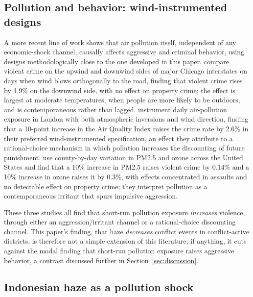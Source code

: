 \documentclass[12pt]{article}
\begin{document}
\subsection{Pollution and behavior: wind-instrumented designs}

A more recent line of work shows that air pollution itself, independent of any economic-shock channel, causally affects aggressive and criminal behavior, using designs methodologically close to the one developed in this paper. \citet{herrnstadt2021} compare violent crime on the upwind and downwind sides of major Chicago interstates on days when wind blows orthogonally to the road, finding that violent crime rises by 1.9\% on the downwind side, with no effect on property crime; the effect is largest at moderate temperatures, when people are more likely to be outdoors, and is contemporaneous rather than lagged. \citet{bondyrothsager2020} instrument daily air-pollution exposure in London with both atmospheric inversions and wind direction, finding that a 10-point increase in the Air Quality Index raises the crime rate by 2.6\% in their preferred wind-instrumented specification, an effect they attribute to a rational-choice mechanism in which pollution increases the discounting of future punishment. \citet{burkhardt2019} use county-by-day variation in PM2.5 and ozone across the United States and find that a 10\% increase in PM2.5 raises violent crime by 0.14\% and a 10\% increase in ozone raises it by 0.3\%, with effects concentrated in assaults and no detectable effect on property crime; they interpret pollution as a contemporaneous irritant that spurs impulsive aggression.

These three studies all find that short-run pollution exposure \emph{increases} violence, through either an aggression/irritant channel or a rational-choice discounting channel. This paper's finding, that haze \emph{decreases} conflict events in conflict-active districts, is therefore not a simple extension of this literature; if anything, it cuts against the modal finding that short-run pollution exposure raises aggressive behavior, a contrast discussed further in Section~\ref{sec:discussion}.

\subsection{Indonesian haze as a pollution shock}
\end{document}
